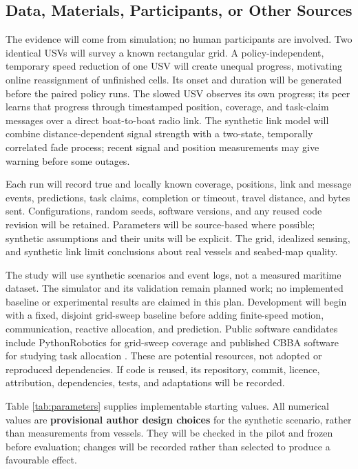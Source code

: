\subsection{Data, Materials, Participants, or Other Sources}
The evidence will come from simulation; no human participants are involved. Two identical USVs will survey a known rectangular grid. A policy-independent, temporary speed reduction of one USV will create unequal progress, motivating online reassignment of unfinished cells. Its onset and duration will be generated before the paired policy runs. The slowed USV observes its own progress; its peer learns that progress through timestamped position, coverage, and task-claim messages over a direct boat-to-boat radio link. The synthetic link model will combine distance-dependent signal strength with a two-state, temporally correlated fade process; recent signal and position measurements may give warning before some outages.

Each run will record true and locally known coverage, positions, link and message events, predictions, task claims, completion or timeout, travel distance, and bytes sent. Configurations, random seeds, software versions, and any reused code revision will be retained. Parameters will be source-based where possible; synthetic assumptions and their units will be explicit. The grid, idealized sensing, and synthetic link limit conclusions about real vessels and seabed-map quality.

The study will use synthetic scenarios and event logs, not a measured maritime dataset. The simulator and its validation remain planned work; no implemented baseline or experimental results are claimed in this plan. Development will begin with a fixed, disjoint grid-sweep baseline before adding finite-speed motion, communication, reactive allocation, and prediction. Public software candidates include PythonRobotics for grid-sweep coverage and published CBBA software for studying task allocation \cite{sakai2018pythonrobotics,choi2009auction}. These are potential resources, not adopted or reproduced dependencies. If code is reused, its repository, commit, licence, attribution, dependencies, tests, and adaptations will be recorded.

Table \ref{tab:parameters} supplies implementable starting values. All numerical values are \textbf{provisional author design choices} for the synthetic scenario, rather than measurements from vessels. They will be checked in the pilot and frozen before evaluation; changes will be recorded rather than selected to produce a favourable effect.

